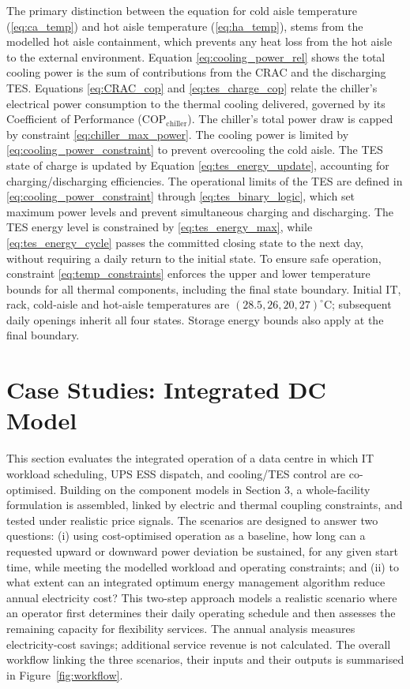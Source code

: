 \documentclass[lettersize,journal]{IEEEtran}
\newcommand{\rev}[1]{#1}
\begin{document}
The primary distinction between the equation for cold aisle temperature (\ref{eq:ca_temp}) and hot aisle temperature (\ref{eq:ha_temp}), stems from the modelled hot aisle containment, which prevents any heat loss from the hot aisle to the external environment. Equation \eqref{eq:cooling_power_rel} shows the total cooling power is the sum of contributions from the CRAC and the discharging TES. Equations \eqref{eq:CRAC_cop} and \eqref{eq:tes_charge_cop} relate the chiller's electrical power consumption to the thermal cooling delivered, governed by its Coefficient of Performance ($\mathrm{COP}_{\mathrm{chiller}}$). The chiller's total power draw is capped by constraint \eqref{eq:chiller_max_power}. The cooling power is limited by \eqref{eq:cooling_power_constraint} to prevent overcooling the cold aisle. The TES state of charge is updated by Equation \eqref{eq:tes_energy_update}, accounting for charging/discharging efficiencies. The operational limits of the TES are defined in \eqref{eq:cooling_power_constraint} through \eqref{eq:tes_binary_logic}, which set maximum power levels and prevent simultaneous charging and discharging. The TES energy level is constrained by \eqref{eq:tes_energy_max}, while \eqref{eq:tes_energy_cycle} passes the committed closing state to the next day, without requiring a daily return to the initial state.
To ensure safe operation, constraint \eqref{eq:temp_constraints} enforces the upper and lower temperature bounds for all thermal components, including the final state boundary. Initial IT, rack, cold-aisle and hot-aisle temperatures are $(28.5,26,20,27)^\circ$C; subsequent daily openings inherit all four states. Storage energy bounds also apply at the final boundary.
 

\section{Case Studies: Integrated DC Model}\label{sec:integrated_model and case studies}

This section evaluates the integrated operation of a data centre  in which IT workload scheduling, UPS ESS dispatch, and cooling/TES control are co-optimised. Building on the component models in Section 3, a whole-facility formulation is assembled, linked by electric and thermal coupling constraints, and tested under realistic price signals. The scenarios are designed to answer two questions: (i) using cost-optimised operation as a baseline, how long can a requested upward or downward power deviation be sustained, for any given start time, while meeting the modelled workload and operating constraints; and (ii) to what extent can an integrated optimum energy management algorithm reduce annual electricity cost? This two-step approach models a realistic scenario where an operator first determines their daily operating schedule and then assesses the remaining capacity for flexibility services. The annual analysis measures electricity-cost savings; additional service revenue is not calculated. \rev{The overall workflow linking the three scenarios, their inputs and their outputs is summarised in Figure~\ref{fig:workflow}.}
\end{document}
